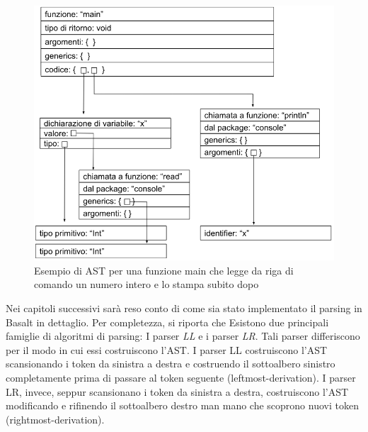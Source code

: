 \begin{figure}[H]
    \centering
        \includegraphics[width=1\textwidth]{../../Assets/BasaltAST.png}
    \caption{\centering Esempio di AST per una funzione main che legge da riga di comando un numero intero e lo stampa subito dopo} 
\end{figure}

Nei capitoli successivi sarà reso conto di come sia stato implementato il parsing in Basalt in dettaglio. Per completezza, si riporta che 
Esistono due principali famiglie di algoritmi di parsing: I parser \textit{LL} e i parser \textit{LR}. Tali parser differiscono per il modo in cui
essi costruiscono l'AST. I parser LL costruiscono l'AST scansionando i token da sinistra a destra e costruendo il sottoalbero sinistro completamente 
prima di passare al token seguente (leftmost-derivation). I parser LR, invece, seppur scansionano i token da sinistra a destra, costruiscono 
l'AST modificando e rifinendo il sottoalbero destro man mano che scoprono nuovi token (rightmost-derivation). \\

